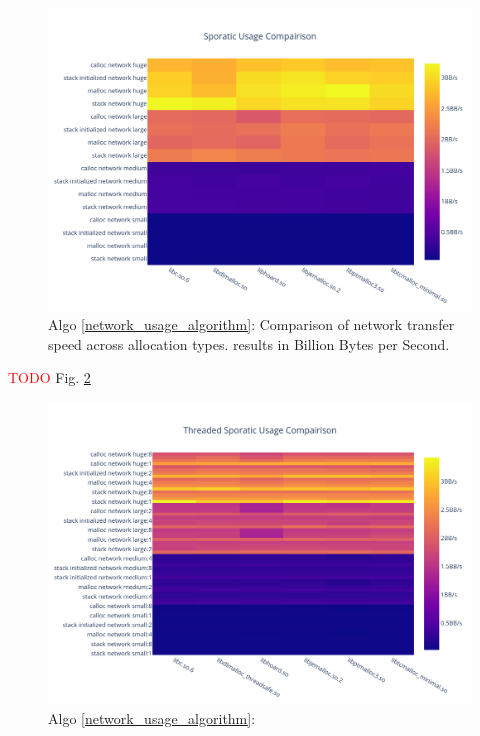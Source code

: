 \documentclass[letterpaper, 10 pt, conference]{ieeeconf}  %
\newcommand*\todo[0]{\textcolor{red}{TODO }}
\begin{document}
\begin{figure}[tbh!]
  \centering
  \includegraphics[width=\columnwidth]{graphs/sporatic_hist.png}
  \caption{ Algo \ref{network_usage_algorithm}: Comparison of network transfer speed across allocation types. results in Billion Bytes per Second. }
  \label{algo3_complete_hist}
\end{figure}

\todo Fig. \ref{algo3_complete_threaded_hist}

\begin{figure}[tbh!]
  \centering
  \includegraphics[width=\columnwidth]{graphs/sporatic_threaded_hist.png}
  \caption{ Algo \ref{network_usage_algorithm}: }
  \label{algo3_complete_threaded_hist}
\end{figure}
\end{document}
